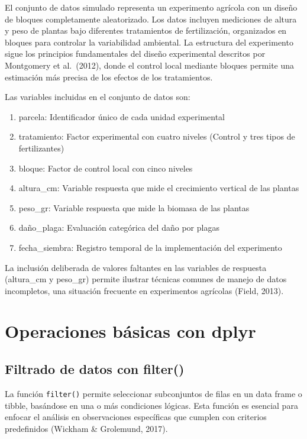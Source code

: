 \documentclass[
  spanish,
  a4paper,
  DIV=11,
  numbers=noendperiod,
  onepage,
  openany]{scrreprt}
\begin{document}
El conjunto de datos simulado representa un experimento agrícola con un
diseño de bloques completamente aleatorizado. Los datos incluyen
mediciones de altura y peso de plantas bajo diferentes tratamientos de
fertilización, organizados en bloques para controlar la variabilidad
ambiental. La estructura del experimento sigue los principios
fundamentales del diseño experimental descritos por Montgomery et
al.~(2012), donde el control local mediante bloques permite una
estimación más precisa de los efectos de los tratamientos.

Las variables incluidas en el conjunto de datos son:

\begin{enumerate}
\def\labelenumi{\arabic{enumi}.}
\item
  parcela: Identificador único de cada unidad experimental
\item
  tratamiento: Factor experimental con cuatro niveles (Control y tres
  tipos de fertilizantes)
\item
  bloque: Factor de control local con cinco niveles
\item
  altura\_cm: Variable respuesta que mide el crecimiento vertical de las
  plantas
\item
  peso\_gr: Variable respuesta que mide la biomasa de las plantas
\item
  daño\_plaga: Evaluación categórica del daño por plagas
\item
  fecha\_siembra: Registro temporal de la implementación del experimento
\end{enumerate}

La inclusión deliberada de valores faltantes en las variables de
respuesta (altura\_cm y peso\_gr) permite ilustrar técnicas comunes de
manejo de datos incompletos, una situación frecuente en experimentos
agrícolas (Field, 2013).

\section{Operaciones básicas con
dplyr}\label{operaciones-buxe1sicas-con-dplyr}

\subsection{Filtrado de datos con
filter()}\label{filtrado-de-datos-con-filter}

La función \texttt{filter()} permite seleccionar subconjuntos de filas
en un data frame o tibble, basándose en una o más condiciones lógicas.
Esta función es esencial para enfocar el análisis en observaciones
específicas que cumplen con criterios predefinidos (Wickham \&
Grolemund, 2017).
\end{document}
